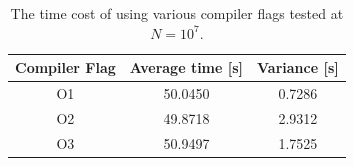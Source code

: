\documentclass[%
reprint,nofootinbib,
amsmath,amssymb,
aps,
]{revtex4-1}
\begin{document}
\begin{table}[H]
	\caption{ \label{compilerflags} The time cost of using various compiler flags tested at $N = 10^7$.}
	\centering 
	\begin{tabular}{|c|c|c|}
		\hline 
		\hspace{1mm} \textbf{Compiler Flag} \hspace{1mm} & \hspace{1mm}\textbf{Average time [s]} \hspace{1mm} & \textbf{Variance [s]} \\ \hline 
		O1& 50.0450 &0.7286 \\
		O2& 49.8718 &2.9312 \\ 
		O3& 50.9497 & 1.7525\\
		\hline 
	\end{tabular} 
\end{table}

\twocolumngrid
\end{document}
